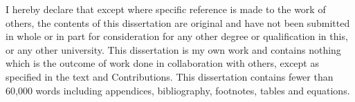 
\begin{declaration}

I hereby declare that except where specific reference is made to the work of 
others, the contents of this dissertation are original and have not been 
submitted in whole or in part for consideration for any other degree or 
qualification in this, or any other university. This dissertation is my own 
work and contains nothing which is the outcome of work done in collaboration 
with others, except as specified in the text and Contributions. This 
dissertation contains fewer than 60,000 words including appendices, 
bibliography, footnotes, tables and equations.


\end{declaration}